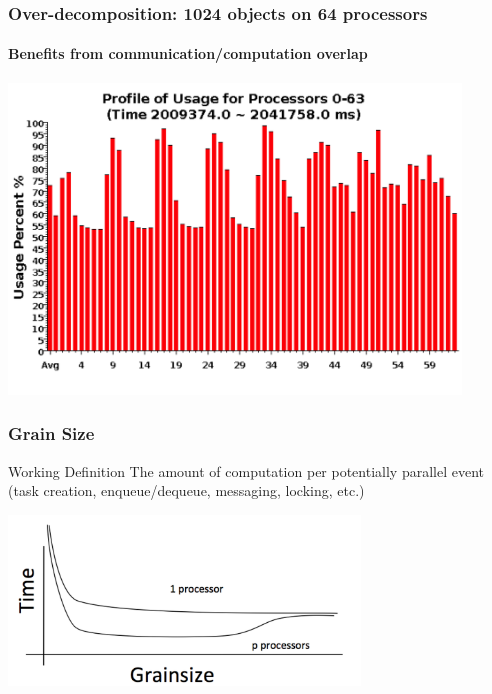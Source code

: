 \begin{frame}[fragile]
\frametitle{Over-decomposition: 1024 objects on 64 processors}
\framesubtitle{Benefits from communication/computation overlap}
\begin{center}\includegraphics[width=0.9\textwidth]{../figures/usageVirtual.png}\end{center}
\end{frame}


\begin{frame}
\frametitle{Grain Size}
  \begin{block}{Working Definition} The amount of computation per potentially
      parallel event (task creation, enqueue/dequeue, messaging,
      locking, etc.)
  \end{block}
  \begin{center} \includegraphics[width=0.7\textwidth]{../figures/grain1.png} \end{center}
\end{frame}
